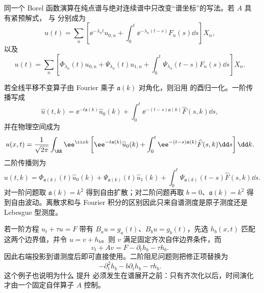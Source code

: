 \begin{exbox}
\label{ex:math-sl-first-abstract-general}
\label{ex:math-sl-second-abstract-general}
\label{ex:math-sl-fourier-first-general}
\label{ex:math-sl-fourier-second-general}
同一个 Borel 函数演算在纯点谱与绝对连续谱中只改变“谱坐标”的写法。若 $A$ 具有紧预解式， 与 分别成为
\begin{equation*}u(t)=\sum_n\left[
 \ee^{-\lambda_nt}u_{0,n}
 +\int_0^t\ee^{-\lambda_n(t-s)}F_n(s)\dd s
 \right]X_n,
\end{equation*}
以及
\begin{equation*}u(t)=\sum_n\left[
 \Phi_{\lambda_n}(t)u_{0,n}
 +\Psi_{\lambda_n}(t)u_{1,n}
 +\int_0^t\Psi_{\lambda_n}(t-s)F_n(s)\dd s
 \right]X_n.
\end{equation*}

若全线平移不变算子由 Fourier 乘子 $\mathfrak a(k)$ 对角化，则沿用 的酉归一化。一阶传播写成
\begin{equation*}\widehat u(t,k)=\ee^{-t\mathfrak a(k)}\widehat u_0(k)
 +\int_0^t\ee^{-(t-s)\mathfrak a(k)}\widehat F(s,k)\dd s,
\end{equation*}
并在物理空间成为
\begin{equation*}u(x,t)=\frac{1}{\sqrt{2\pi}}\int_{\RR}\ee^{\ii xk}
 \left[\ee^{-t\mathfrak a(k)}\widehat u_0(k)
 +\int_0^t\ee^{-(t-s)\mathfrak a(k)}\widehat F(s,k)\dd s\right]\dd k.
\end{equation*}
二阶传播则为
\begin{equation*}\widehat u(t,k)=\Phi_{\mathfrak a(k)}(t)\widehat u_0(k)
 +\Psi_{\mathfrak a(k)}(t)\widehat u_1(k)
 +\int_0^t\Psi_{\mathfrak a(k)}(t-s)\widehat F(s,k)\dd s.
\end{equation*}
对一阶问题取 $\mathfrak a(k)=k^2$ 得到自由扩散；对二阶问题再取 $b=0$、$\mathfrak a(k)=k^2$ 得到自由波动。离散求和与 Fourier 积分的区别因此只来自谱测度是原子测度还是 Lebesgue 型测度。
\end{exbox}

\begin{exbox}[含时非齐次边界条件的齐次化]\label{ex:math-sl-time-lifting-template}
若一阶方程 $u_t+\tau u=F$ 带有 $B_au=g_a(t)$、$B_bu=g_b(t)$，先选 $h_b(x,t)$ 匹配这两个边界值，并令 $u=v+h_b$。则 $v$ 满足固定齐次自伴边界条件，而
\[
 v_t+Av=F-\partial_t h_b-\tau h_b.
\]
因此右端投影到谱测度后即可直接使用。二阶阻尼问题则把修正项替换为
\[
 -\partial_t^2h_b-b\partial_t h_b-\tau h_b.
\]
这个例子也说明为什么 提升 必须发生在谱展开之前：只有齐次化以后，时间演化才由一个固定自伴算子 $A$ 控制。
\end{exbox}

